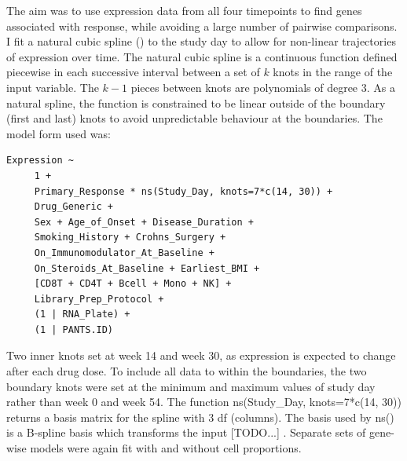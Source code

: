 The aim was to use expression data from all four timepoints to find genes associated with response,
while avoiding a large number of pairwise comparisons.
I fit a natural cubic spline () to the study day to allow for non-linear trajectories of expression over time.
The natural cubic spline is a continuous function defined piecewise in each successive interval between a set of $k$ knots in the range of the input variable.
The $k-1$ pieces between knots are polynomials of degree 3. 
As a natural spline, the function is constrained to be linear outside of the boundary (first and last) knots to avoid unpredictable behaviour at the boundaries.
The model form used was:

\begin{lstlisting}
Expression ~
     1 +
     Primary_Response * ns(Study_Day, knots=7*c(14, 30)) + 
     Drug_Generic + 
     Sex + Age_of_Onset + Disease_Duration +
     Smoking_History + Crohns_Surgery +
     On_Immunomodulator_At_Baseline + 
     On_Steroids_At_Baseline + Earliest_BMI +
     [CD8T + CD4T + Bcell + Mono + NK] +
     Library_Prep_Protocol +
     (1 | RNA_Plate) +
     (1 | PANTS.ID)
\end{lstlisting}

Two inner knots set at week 14 and week 30, as expression is expected to change after each drug dose.
To include all data to within the boundaries, the two boundary knots were set at the minimum and maximum values of study day rather than week 0 and week 54.
The function ns(Study\_Day, knots=7*c(14, 30)) returns a basis matrix for the spline with 3 \gls{df} (columns).
The basis used by ns() is a B-spline basis which transforms the input [TODO...] \autocite{perperoglou2019ReviewSplineFunction}.
Separate sets of gene-wise models were again fit with and without cell proportions.

